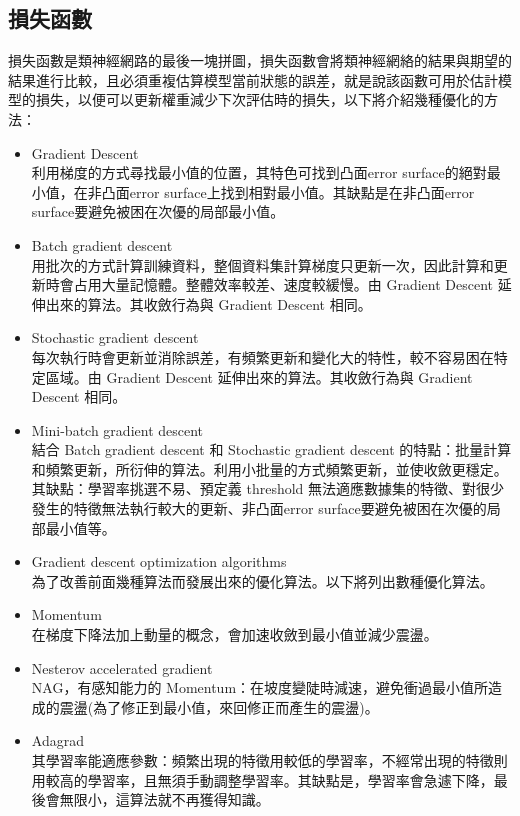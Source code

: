 \documentclass[14pt,a4paper]{report}  %
\begin{document}
\subsection{損失函數}
損失函數是類神經網路的最後一塊拼圖，損失函數會將類神經網絡的結果與期望的結果進行比較，且必須重複估算模型當前狀態的誤差，就是說該函數可用於估計模型的損失，以便可以更新權重減少下次評估時的損失，以下將介紹幾種優化的方法：\\

\begin{itemize}
\item Gradient Descent\\
利用梯度的方式尋找最小值的位置，其特色可找到凸面error surface的絕對最小值，在非凸面error surface上找到相對最小值。其缺點是在非凸面error surface要避免被困在次優的局部最小值。
\item Batch gradient descent\\
用批次的方式計算訓練資料，整個資料集計算梯度只更新一次，因此計算和更新時會占用大量記憶體。整體效率較差、速度較緩慢。由 Gradient Descent 延伸出來的算法。其收斂行為與 Gradient Descent 相同。
\item Stochastic gradient descent\\
每次執行時會更新並消除誤差，有頻繁更新和變化大的特性，較不容易困在特定區域。由 Gradient Descent 延伸出來的算法。其收斂行為與 Gradient Descent 相同。
\item Mini-batch gradient descent\\
結合 Batch gradient descent 和 Stochastic gradient descent 的特點：批量計算和頻繁更新，所衍伸的算法。利用小批量的方式頻繁更新，並使收斂更穩定。其缺點：學習率挑選不易、預定義 threshold 無法適應數據集的特徵、對很少發生的特徵無法執行較大的更新、非凸面error surface要避免被困在次優的局部最小值等。
\item Gradient descent optimization algorithms\\
為了改善前面幾種算法而發展出來的優化算法。以下將列出數種優化算法。
\item Momentum\\
在梯度下降法加上動量的概念，會加速收斂到最小值並減少震盪。
\item Nesterov accelerated gradient\\
NAG，有感知能力的 Momentum：在坡度變陡時減速，避免衝過最小值所造成的震盪(為了修正到最小值，來回修正而產生的震盪)。
\item Adagrad\\
其學習率能適應參數：頻繁出現的特徵用較低的學習率，不經常出現的特徵則用較高的學習率，且無須手動調整學習率。其缺點是，學習率會急遽下降，最後會無限小，這算法就不再獲得知識。

\end{itemize}
\end{document}
